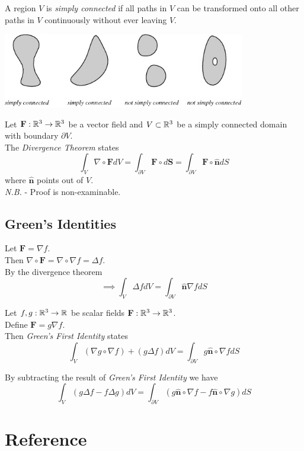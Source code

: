 \documentclass[11pt,a4paper]{article}
\begin{document}
A region $V$ is \textit{simply connected} if all paths in $V$ can be transformed onto all other paths in $V$ continuously without ever leaving $V$.
\begin{center}\includegraphics[width=400px]{img/simplyconnected.jpg}\end{center}

Let $\textbf{F}:\mathbb{R}^3\to\mathbb{R}^3$ be a vector field and $V\subset\mathbb{R}^3$ be a simply connected domain with boundary $\partial V$.\\
The \textit{Divergence Theorem} states
$$\int_V\nabla\circ\textbf{F}dV=\int_{\partial V}\textbf{F}\circ d\textbf{S}=\int_{\partial V}\textbf{F}\circ\hat{\textbf{n}}dS$$
where $\hat{\textbf{n}}$ points out of $V$.\\
\textit{N.B.} - Proof is non-examinable.

\subsection{Green's Identities}

Let $\textbf{F}=\nabla f$.\\
Then $\nabla\circ\textbf{F}=\nabla\circ\nabla f=\Delta f$.\\
By the divergence theorem
$$\implies\int_V\Delta fdV=\int_{\partial V}\hat{\textbf{n}}\nabla f dS$$

Let $f,g:\mathbb{R}^3\to\mathbb{R}$ be scalar fields $\textbf{F}:\mathbb{R}^3\to\mathbb{R}^3$.\\
Define $\textbf{F}=g\nabla f$.\\
Then \textit{Green's First Identity} states
$$\int_V(\nabla g\circ\nabla f)+(g\Delta f)dV=\int_{\partial V}g\hat{\textbf{n}}\circ\nabla fdS$$

By subtracting the result of \textit{Green's First Identity} we have
$$\int_V(g\Delta f-f\Delta g)dV=\int_{\partial V}(g\hat{\textbf{n}}\circ\nabla f-f\hat{\textbf{n}}\circ\nabla g)dS$$


\setcounter{section}{-1}
\newpage\section{Reference}
\end{document}
